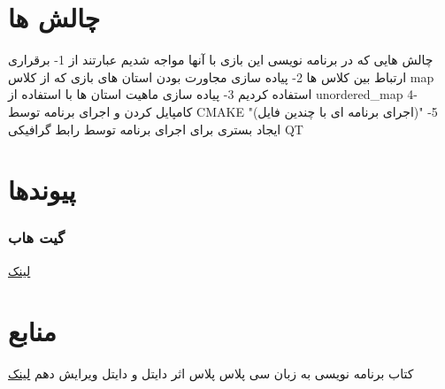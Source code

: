 \documentclass[pdf,titlepage,a4paper]{report}
\begin{document}
	\part{چالش ها}
	چالش هایی که در برنامه نویسی این بازی با آنها مواجه شدیم عبارتند از 
	1- برقراری ارتباط بین کلاس ها 
	2- پیاده سازی مجاورت بودن استان های بازی که از کلاس map  استفاده کردیم
	3- پیاده سازی ماهیت استان ها با استفاده از unordered_map
	4- کامپایل کردن و اجرای برنامه توسط CMAKE "(اجرای برنامه ای با چندین فایل)"
    5- ایجاد بستری برای اجرای برنامه توسط رابط گرافیکی QT
	\newpage
		
	\part{پیوندها}
	\section{گیت هاب}
	\href{https://github.com/Matin0789/Condottiere-.git}{لینک}

	\newpage
	
	
	
	\part{منابع}
	کتاب برنامه نویسی به زبان سی پلاس پلاس اثر دایتل و دایتل ویرایش دهم
	\href{https://www.geeksforgeeks.org/c-plus-plus/}{لینک}
\end{document}

